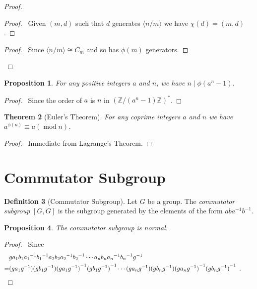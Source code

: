 \documentclass{book}
\let\qed\relax
\newtheorem{prop}{Proposition}[chapter]
\newtheorem{thm}[prop]{Theorem}
\theoremstyle{definition}
\newtheorem{df}[prop]{Definition}
\newcommand{\inv}[1]{\ensuremath{{#1}^{-1}}}
\renewcommand{\mod}{\ensuremath{\operatorname{mod}}}
\begin{document}
\begin{proof}
\pf
{}
\begin{proof}
\pf\ Given $(m,d)$ such that $d$ generates $\langle n/m \rangle$ we have $\chi(d) = (m,d)$.
\end{proof}
\begin{proof}
\pf\ Since $\langle n/m \rangle \cong C_m$ and so has $\phi(m)$ generators.
\end{proof}
\qed
\end{proof}

\begin{prop}
For any positive integers $a$ and $n$, we have $n \mid \phi(a^n - 1)$.
\end{prop}

\begin{proof}
\pf\ Since the order of $a$ is $n$ in $(\mathbb{Z} / (a^n - 1)\mathbb{Z})^*$. \qed
\end{proof}

\begin{thm}[Euler's Theorem]
For any coprime integers $a$ and $n$ we have $a^{\phi(n)} \equiv a (\mod n)$.
\end{thm}

\begin{proof}
\pf\ Immediate from Lagrange's Theorem. \qed
\end{proof}

\section{Commutator Subgroup}

\begin{df}[Commutator Subgroup]
Let $G$ be a group. The \emph{commutator subgroup} $[G,G]$ is the subgroup generated by the elements of the form $ab\inv{a}\inv{b}$.
\end{df}

\begin{prop}
The commutator subgroup is normal.
\end{prop}

\begin{proof}
\pf\ Since
\begin{align*} 
& g a_1 b_1 \inv{a_1} \inv{b_1} a_2 b_2 \inv{a_2} \inv{b_2} \cdots a_n b_n \inv{a_n} \inv{b_n} \inv{g} \\
= & (g a_1 \inv{g}) (g b_1 \inv{g}) \inv{(g a_1 \inv{g})} \inv{(g b_1 \inv{g})} \cdots (g a_n \inv{g}) (g b_n \inv{g}) \inv{(g a_n \inv{g})} \inv{(g b_n \inv{g})} \enspace . \qquad \qed
\end{align*}
\end{proof}
\end{document}
